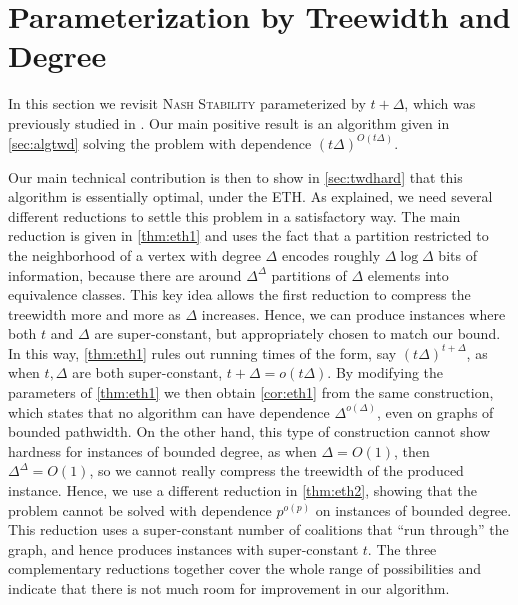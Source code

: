 \documentclass[letterpaper,USenglish,cleveref, autoref, thm-restate]{lipics-v2021}
\begin{document}
\section{Parameterization by Treewidth and Degree}\label{sec:twd}

In this section we revisit \textsc{Nash Stability} parameterized by $t+\Delta$,
which was previously studied in \cite{Peters16a}.  Our main positive result is
an algorithm given in \cref{sec:algtwd} solving the problem with dependence
$(t\Delta)^{O(t\Delta)}$. 

Our main technical contribution is then to show in \cref{sec:twdhard} that this
algorithm is essentially optimal, under the ETH.  As explained, we need several
different reductions to settle this problem in a satisfactory way. The main
reduction is given in \cref{thm:eth1} and uses the fact that a partition
restricted to the neighborhood of a vertex with degree $\Delta$ encodes roughly
$\Delta\log\Delta$ bits of information, because there are around
$\Delta^{\Delta}$ partitions of $\Delta$ elements into equivalence classes.
This key idea allows the first reduction to compress the treewidth more and
more as $\Delta$ increases. Hence, we can produce instances where both $t$ and
$\Delta$ are super-constant, but appropriately chosen to match our bound. In
this way, \cref{thm:eth1} rules out running times of the form, say
$(t\Delta)^{t+\Delta}$, as when $t,\Delta$ are both super-constant,
$t+\Delta=o(t\Delta)$. By modifying the parameters of \cref{thm:eth1} we then
obtain \cref{cor:eth1} from the same construction, which states that no
algorithm can have dependence $\Delta^{o(\Delta)}$, even on graphs of bounded
pathwidth.  On the other hand, this type of construction cannot show hardness
for instances of bounded degree, as when $\Delta=O(1)$, then
$\Delta^{\Delta}=O(1)$, so we cannot really compress the treewidth of the
produced instance. Hence, we use a different reduction in \cref{thm:eth2},
showing that the problem cannot be solved with dependence $p^{o(p)}$ on
instances of bounded degree. This reduction uses a super-constant number of
coalitions that ``run through'' the graph, and hence produces instances with
super-constant $t$.  The three complementary reductions together cover the
whole range of possibilities and indicate that there is not much room for
improvement in our algorithm.
\end{document}
